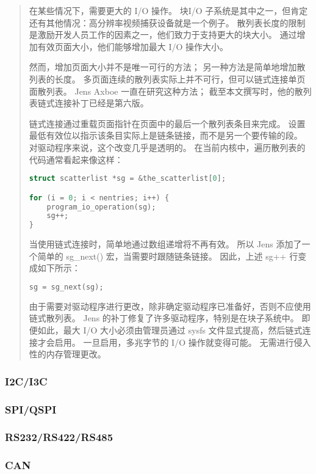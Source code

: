 \begin{quote}
在某些情况下，需要更大的 I/O 操作。
块I/O 子系统是其中之一，但肯定还有其他情况：高分辨率视频捕获设备就是一个例子。
散列表长度的限制是激励开发人员工作的因素之一，他们致力于支持更大的块大小。
通过增加有效页面大小，他们能够增加最大 I/O 操作大小。

然而，增加页面大小并不是唯一可行的方法；
另一种方法是简单地增加散列表的长度。
多页面连续的散列表实际上并不可行，但可以链式连接单页面散列表。
Jens Axboe 一直在研究这种方法；
截至本文撰写时，他的散列表链式连接补丁已经是第六版。

链式连接通过重载页面指针在页面中的最后一个散列表条目来完成。
设置最低有效位以指示该条目实际上是链条链接，而不是另一个要传输的段。
对驱动程序来说，这个改变几乎是透明的。
在当前内核中，遍历散列表的代码通常看起来像这样：

\begin{lstlisting}[language=C]
struct scatterlist *sg = &the_scatterlist[0];

for (i = 0; i < nentries; i++) {
    program_io_operation(sg);
    sg++;
}
\end{lstlisting}

当使用链式连接时，简单地通过数组递增将不再有效。
所以 Jens 添加了一个简单的 sg\_next() 宏，当需要时跟随链条链接。
因此，上述 sg++ 行变成如下所示：

\begin{lstlisting}[language=C]
sg = sg_next(sg);
\end{lstlisting}

由于需要对驱动程序进行更改，除非确定驱动程序已准备好，否则不应使用链式散列表。
Jens 的补丁修复了许多驱动程序，特别是在块子系统中。
即便如此，最大 I/O 大小必须由管理员通过 sysfs 文件显式提高，然后链式连接才会启用。
一旦启用，多兆字节的 I/O 操作就变得可能。
无需进行侵入性的内存管理更改。
\end{quote}

\subsubsection{I2C/I3C}

\subsubsection{SPI/QSPI}

\subsubsection{RS232/RS422/RS485}

\subsubsection{CAN}

